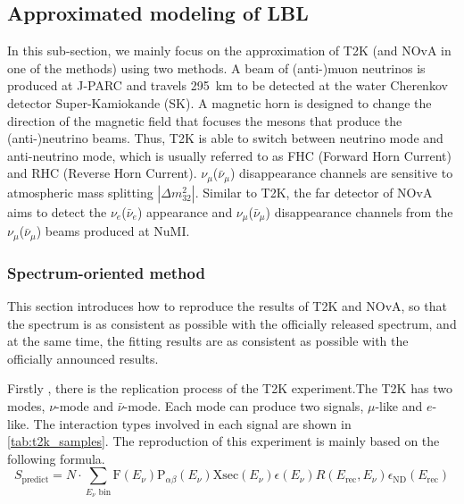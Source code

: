\subsection{Approximated modeling of LBL}

%
In this sub-section, we mainly focus on the approximation of T2K (and NOvA in one of the methods) using two methods. A beam of (anti-)muon neutrinos is produced at J-PARC and travels 295~km to be detected at the water Cherenkov detector Super-Kamiokande (SK). A magnetic horn is designed to change the direction of the  magnetic field that focuses the mesons that produce the (anti-)neutrino beams. Thus, T2K is able to switch between neutrino mode and anti-neutrino mode, which is usually referred to as FHC (Forward Horn Current) and RHC (Reverse Horn Current). $\nu_{\mu}$($\bar{\nu}_{\mu}$) disappearance channels are sensitive to atmospheric mass splitting $|\Delta m_{32}^2|$. Similar to T2K, the far detector of NOvA aims to detect the $\nu_e$($\bar{\nu}_e$) appearance and $\nu_{\mu}$($\bar{\nu}_{\mu}$) disappearance channels from the $\nu_{\mu}$($\bar{\nu}_{\mu}$) beams produced at NuMI. 

\subsubsection{Spectrum-oriented method}
This section introduces how to reproduce the results of T2K and NOvA, so that the spectrum is as consistent as possible with the officially released spectrum, and at the same time, the fitting results are as consistent as possible with the officially announced results.

Firstly , there is the replication process of the T2K experiment.The T2K has two modes, $\nu$-mode  and $\bar{\nu}$-mode. Each mode can produce two signals, $\mu$-like and $e$-like. The interaction types involved in each signal are shown in \autoref{tab:t2k_samples}. The reproduction of this experiment is mainly based on the following formula.
\begin{equation}
S_{\text{predict}} = N \cdot \sum_{E_\nu \text{ bin}} \mathrm{F}(E_\nu) \mathrm{P}_{\alpha\beta}(E_\nu) \mathrm{Xsec}(E_\nu) \epsilon(E_\nu) R(E_{\text{rec}}, E_\nu) \epsilon_{\text{ND}}(E_{\text{rec}})
\end{equation}

